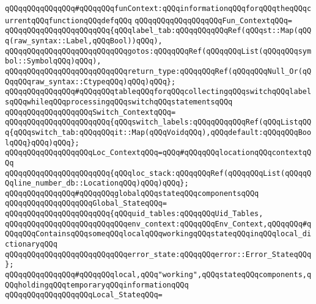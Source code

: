 \newline
\verb|qQQqqQQqqQQqqQQq#qQQqqQQqfunContext:qQQqinformationqQQqforqQQqtheqQQqcurrentqQQqfunctionqQQqdefqQQq|\newline
\verb|qQQqqQQqqQQqqQQqqQQqFun_ContextqQQq=|\newline
\verb|qQQqqQQqqQQqqQQqqQQqqQQq{qQQqlabel_tab:qQQqqQQqqQQqRef(qQQqst::Map(qQQq(raw_syntax::Label,qQQqBool))qQQq),|\newline
\verb|qQQqqQQqqQQqqQQqqQQqqQQqqQQqgotos:qQQqqQQqRef(qQQqqQQqList(qQQqqQQqsymbol::SymbolqQQq)qQQq),|\newline
\verb|qQQqqQQqqQQqqQQqqQQqqQQqqQQqreturn_type:qQQqqQQqRef(qQQqqQQqNull_Or(qQQqqQQqraw_syntax::CtypeqQQq)qQQq)qQQq};|\newline
\newline
\verb|qQQqqQQqqQQqqQQq#qQQqqQQqtableqQQqforqQQqcollectingqQQqswitchqQQqlabelsqQQqwhileqQQqprocessingqQQqswitchqQQqstatementsqQQq|\newline
\verb|qQQqqQQqqQQqqQQqqQQqSwitch_ContextqQQq=|\newline
\verb|qQQqqQQqqQQqqQQqqQQqqQQq{qQQqswitch_labels:qQQqqQQqqQQqRef(qQQqListqQQq{qQQqswitch_tab:qQQqqQQqit::Map(qQQqVoidqQQq),qQQqdefault:qQQqqQQqBoolqQQq}qQQq)qQQq};|\newline
\newline
\verb|qQQqqQQqqQQqqQQqqQQqLoc_ContextqQQq=qQQq#qQQqqQQqlocationqQQqcontextqQQq|\newline
\verb|qQQqqQQqqQQqqQQqqQQqqQQq{qQQqloc_stack:qQQqqQQqRef(qQQqqQQqList(qQQqqQQqline_number_db::LocationqQQq)qQQq)qQQq};|\newline
\newline
\verb|qQQqqQQqqQQqqQQq#qQQqqQQqglobalqQQqstateqQQqcomponentsqQQq|\newline
\verb|qQQqqQQqqQQqqQQqqQQqGlobal_StateqQQq=|\newline
\verb|qQQqqQQqqQQqqQQqqQQqqQQq{qQQquid_tables:qQQqqQQqUid_Tables,|\newline
\verb|qQQqqQQqqQQqqQQqqQQqqQQqqQQqenv_context:qQQqqQQqEnv_Context,qQQqqQQq#qQQqqQQqContainsqQQqsomeqQQqlocalqQQqworkingqQQqstateqQQqinqQQqlocal_dictionaryqQQq|\newline
\verb|qQQqqQQqqQQqqQQqqQQqqQQqqQQqerror_state:qQQqqQQqerror::Error_StateqQQq};|\newline
\newline
\verb|qQQqqQQqqQQqqQQq#qQQqqQQqlocal,qQQq"working",qQQqstateqQQqcomponents,qQQqholdingqQQqtemporaryqQQqinformationqQQq|\newline
\verb|qQQqqQQqqQQqqQQqqQQqLocal_StateqQQq=|\newline
